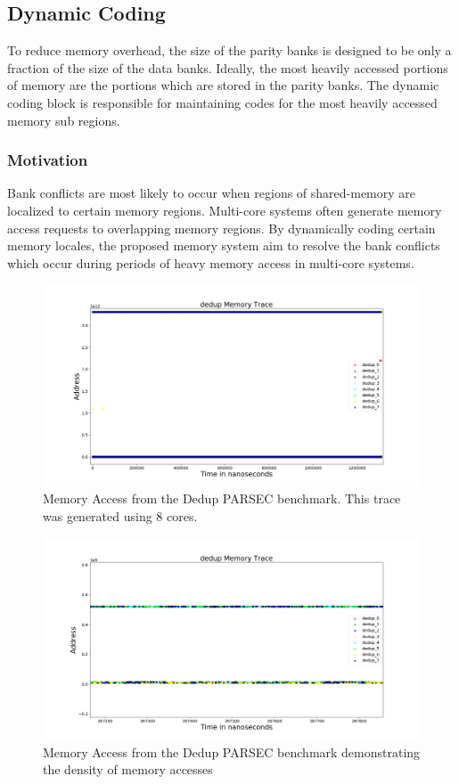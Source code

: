 \subsection{Dynamic Coding}
\label{sec:dynamicCoding}
To reduce memory overhead, the size of the parity banks is designed to be only a fraction of the size of the data banks. Ideally, the most heavily accessed portions of memory are the portions which are stored in the parity banks. The dynamic coding block is responsible for maintaining codes for the most heavily accessed memory sub regions.

\subsubsection{Motivation}
Bank conflicts are most likely to occur when regions of shared-memory are localized to certain memory regions. Multi-core systems often generate memory access requests to overlapping memory regions. By dynamically coding certain memory locales, the proposed memory system aim to resolve the bank conflicts which occur during periods of heavy memory access in multi-core systems.

\begin{figure}[htbp]
		\includegraphics[width=\linewidth]{fig/dedup_whole.png}
		\caption{Memory Access from the Dedup PARSEC benchmark. This trace was generated using 8 cores.}
		\label{fig:dedup_whole}
\end{figure}

\begin{figure}[htbp]
		\includegraphics[width=\linewidth]{fig/dedup_dense.png}
		\caption{Memory Access from the Dedup PARSEC benchmark demonstrating the density of memory accesses}
		\label{fig:dedup_dense}
\end{figure}

